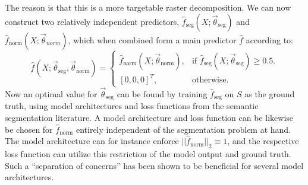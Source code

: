 The reason is that this is a more targetable raster decomposition.
We can now construct two relatively independent predictors, $\hat{f}_{\mathrm{seg}}(X; \vec{\theta}_{\mathrm{seg}})$ and $\hat{f}_{\mathrm{norm}}(X; \vec{\theta}_{norm})$, which when combined form a main predictor $\hat{f}$ according to:
\begin{equation*}
  \hat{f}\left(X; \vec{\theta}_{\mathrm{seg}}, \vec{\theta}_{\mathrm{norm}}\right)
  =
  \begin{cases}
    \hat{f}_{\mathrm{norm}}\left(X; \vec{\theta}_{\mathrm{norm}}\right), &\text{if } \hat{f}_{\mathrm{seg}}\left(X; \vec{\theta}_{\mathrm{seg}}\right) \geq 0.5. \\
    {\left[0, 0, 0\right]}^T, &\text{otherwise.}
  \end{cases}
\end{equation*}
Now an optimal value for $\vec{\theta}_{\mathrm{seg}}$ can be found by training $\hat{f}_{\mathrm{seg}}$ on $S$ as the ground truth, using model architectures and loss functions from the semantic segmentation literature.
A model architecture and loss function can be likewise be chosen for $\hat{f}_{\mathrm{norm}}$ entirely independent of the segmentation problem at hand.
The model architecture can for instance enforce $||\hat{f}_{\mathrm{norm}}||_2 \equiv 1$, and the respective loss function can utilize this restriction of the model output and ground truth.
Such a \enquote{separation of concerns} has been shown to be beneficial for several model architectures.

